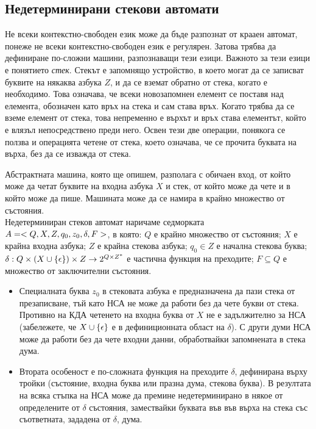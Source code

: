 \documentclass[11pt]{article}
\begin{document}
\subsection{Недетерминирани стекови автомати}
Не всеки контекстно-свободен език може да бъде разпознат от крааен автомат, понеже не всеки контекстно-свободен език е регулярен. Затова трябва да дефиниране по-сложни машини, разпознаващи тези езици. Важното за тези езици е понятието \emph{стек}. Стекът е запомнящо устройство, в което могат да се записват буквите на някаква азбука $Z$, и да се вземат обратно от стека, когато е необходимо. Това означава, че всеки новозапомнен елемент се поставя над елемента, обозначен като връх на стека и сам става връх. Когато трябва да се вземе елемент от стека, това непременно е върхът и връх става елементът, който е влязъл непосредствено преди него. Освен тези две операции, понякога се ползва и операцията четене от стека, което означава, че се прочита буквата на върха, без да се изважда от стека. \par

Абстрактната машина, която ще опишем, разполага с обичаен вход, от който може да четат буквите на входна азбука $X$ и стек, от който може да чете и в който може да пише. Машината може да се намира в крайно множество от състояния. \\

 Недетерминиран стеков автомат наричаме седморката \\$A = <Q, X, Z, q_{0}, z_{0}, \delta, F>$, в която: $Q$ е крайно множество от състояния; $X$ е крайна входна азбука; $Z$ е крайна стекова азбука; $q_{0} \in Z$ е начална стекова буква; $\delta: Q \times (X \cup \{\epsilon\}) \times Z \to 2^{Q \times Z^*}$ е частична функция на преходите; $F \subseteq Q$ е множество от заключителни състояния. \par

\begin{itemize}
	\item Специалната буква $z_{0}$ в стековата азбука е предназначена да пази стека от презаписване, тъй като НСА не може да работи без да чете букви от стека. Противно на КДА четенето на входна буква от $X$ не е задължително за НСА (забележете, че $X \cup \{\epsilon\}$ е в дефиниционната област на $\delta$). С други думи НСА може да работи без да чете входни данни, обработвайки запомнената в стека дума.
	\item Втората особеност е по-сложната функция на преходите $\delta$, дефинирана върху тройки (състояние, входна буква или празна дума, стекова буква). В резултата на всяка стъпка на НСА може да премине недетерминирано в някое от определените от $\delta$ състояния, замествайки буквата във във върха на стека със съответната, зададена от $\delta$, дума.  
\end{itemize} 
\end{document}
